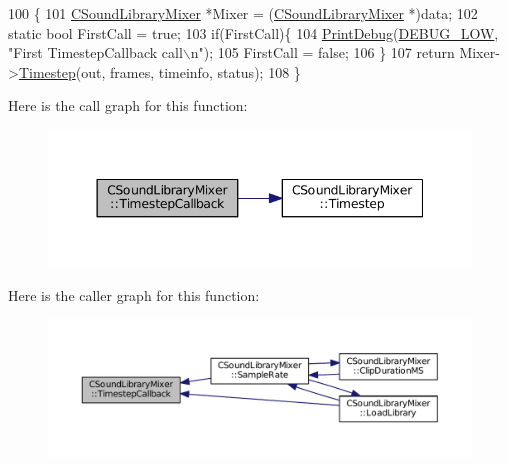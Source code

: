 \begin{DoxyCode}
100                                                                                                            
                                                                      \{
101     \hyperlink{classCSoundLibraryMixer}{CSoundLibraryMixer} *Mixer = (\hyperlink{classCSoundLibraryMixer}{CSoundLibraryMixer} *)data;
102 \textcolor{keyword}{static} \textcolor{keywordtype}{bool} FirstCall = \textcolor{keyword}{true};
103 \textcolor{keywordflow}{if}(FirstCall)\{
104     \hyperlink{Debug_8h_aa5f00f5537c9760f6ae1782460748ab9}{PrintDebug}(\hyperlink{Debug_8h_a3a5f3fc09784650d8388cb854882f840}{DEBUG\_LOW}, \textcolor{stringliteral}{"First TimestepCallback call\(\backslash\)n"});
105     FirstCall = \textcolor{keyword}{false};   
106 \}
107     \textcolor{keywordflow}{return} Mixer->\hyperlink{classCSoundLibraryMixer_ad3ef0b67b77862e8c88949c3415095e7}{Timestep}(out, frames, timeinfo, status);
108 \}
\end{DoxyCode}
Here is the call graph for this function\+:
\nopagebreak
\begin{figure}[H]
\begin{center}
\leavevmode
\includegraphics[width=344pt]{classCSoundLibraryMixer_a1d04553aa93769b8bff4bb5c8b7bdfa1_cgraph}
\end{center}
\end{figure}
Here is the caller graph for this function\+:
\nopagebreak
\begin{figure}[H]
\begin{center}
\leavevmode
\includegraphics[width=350pt]{classCSoundLibraryMixer_a1d04553aa93769b8bff4bb5c8b7bdfa1_icgraph}
\end{center}
\end{figure}


